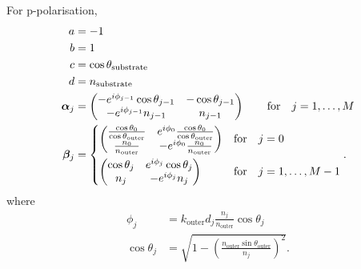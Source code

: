 \documentclass[]{article}
\begin{document}
	For p-polarisation,
	\begin{align}
		a&=-1\\
		b&=1\\
		c&=\cos\theta_\text{substrate}\\
		d&=n_{\text{substrate}}\\
		\bm{\alpha}_j&=
		\begin{pmatrix}
			-e^{i\phi_{j-1}}\cos\theta_{j-1}&-\cos\theta_{j-1}\\
			-e^{i\phi_{j-1}}n_{j-1}&n_{j-1}
		\end{pmatrix}\quad\quad\text{for}\quad j=1,\dots,M\\
		\bm{\beta}_j&=
		\begin{dcases}
			\begin{pmatrix}
				\frac{\cos\theta_0}{\cos\theta_\text{outer}}&e^{i\phi_0}\frac{\cos\theta_0}{\cos\theta_\text{outer}}\\
				\frac{n_0}{n_\text{outer}}&-e^{i\phi_0}\frac{n_0}{n_\text{outer}}
			\end{pmatrix}&\text{for}\quad j=0\\
			\begin{pmatrix}
				\cos\theta_j&e^{i\phi_j}\cos\theta_j\\
				n_j&-e^{i\phi_j}n_j
			\end{pmatrix}&\text{for}\quad j=1,\dots,M-1
		\end{dcases}.
	\end{align}
	where 
	\begin{align}
		\phi_j&=k_\text{outer}d_j\frac{n_j}{n_\text{outer}}\cos\theta_{j}\\
		\cos\theta_j&=\sqrt{1-\left(\frac{n_\text{outer}\sin\theta_\text{outer}}{n_j}\right)^2}.
	\end{align}
\end{document}
